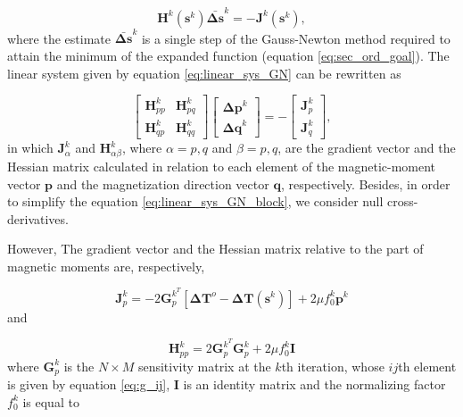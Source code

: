 \begin{equation}
\mathbf{H}^k (\mathbf{s}^{k}) \bar{\mathbf{\Delta s}}^{k} = - \mathbf{J}^k (\mathbf{s}^k),
\label{eq:linear_sys_GN}
\end{equation}
where the estimate $\bar{\mathbf{\Delta s}}^{k}$ is a single step of the Gauss-Newton method required to attain the minimum of the expanded function (equation \ref{eq:sec_ord_goal}). The linear system given by equation \ref{eq:linear_sys_GN} can be rewritten as 

\begin{equation}
\left[
\begin{array}{c|c}
\mathbf{H}_{pp}^{k} & \mathbf{H}_{pq}^{k} \\
\hline
\mathbf{H}_{qp}^{k}& \mathbf{H}_{qq}^{k}
\end{array}
\right] \left[ \begin{array}{c}
\mathbf{\Delta p}^k \\ 
\mathbf{\Delta q}^k 
\end{array} \right] = -\left[ \begin{array}{c}
\mathbf{J}_{p}^{k} \\ 
\mathbf{J}_{q}^{k} 
\end{array} \right] ,
\label{eq:linear_sys_GN_block}
\end{equation}
in which $\mathbf{J}_{\alpha}^{k}$ and $\mathbf{H}_{\alpha \beta}^{k}$, where $\alpha = p,q$ and $\beta = p,q$, are the gradient vector and the Hessian matrix calculated in relation to each element of the magnetic-moment vector $\mathbf{p}$ and the magnetization direction vector $\mathbf{q}$, respectively. Besides, in order to simplify the equation \ref{eq:linear_sys_GN_block}, we consider null cross-derivatives. 

However, The gradient vector and the Hessian matrix relative to the part of magnetic moments are, respectively,

\begin{equation}
\mathbf{J}_{p}^{k} = -2 \mathbf{G}_{p}^{k^T} [ \mathbf{\Delta T}^o -  \mathbf{\Delta T} (\mathbf{s}^k) ] + 2\mu f_{0}^{k} \mathbf{p}^k 
\label{eq:grad_p}
\end{equation}   
and   

\begin{equation}
\mathbf{H}_{pp}^{k} = 2 \mathbf{G}_{p}^{k^T} \mathbf{G}_{p}^{k} + 2 \mu f_{0}^{k} \mathbf{I} 
\label{eq:hess_p}
\end{equation}
where $\mathbf{G}_p^{k}$ is the $N \times M$ sensitivity matrix at the $k$th iteration, whose $ij$th element is given by equation \ref{eq:g_ij}, $\mathbf{I}$ is an identity matrix and the normalizing factor $f_{0}^{k}$ is equal to

